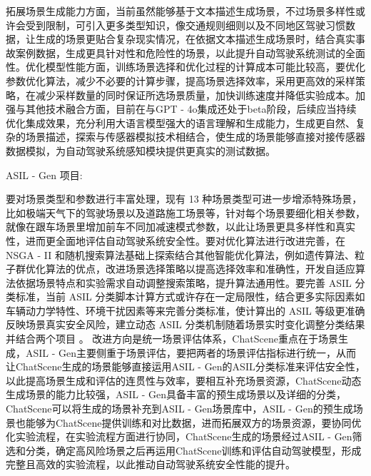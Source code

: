 拓展场景生成能力方面，当前虽然能够基于文本描述生成场景，不过场景多样性或许会受到限制，可引入更多类型知识，像交通规则细则以及不同地区驾驶习惯数据，让生成的场景更贴合复杂现实情况，在依据文本描述生成场景时，结合真实事故案例数据，生成更具针对性和危险性的场景，以此提升自动驾驶系统测试的全面性。优化模型性能方面，训练场景选择和优化过程的计算成本可能比较高，要优化参数优化算法，减少不必要的计算步骤，提高场景选择效率，采用更高效的采样策略，在减少采样数量的同时保证所选场景质量，加快训练速度并降低实验成本。加强与其他技术融合方面，目前在与GPT - 4o集成还处于beta阶段\cite{uslu2014underground}，后续应当持续优化集成效果，充分利用大语言模型强大的语言理解和生成能力，生成更自然、复杂的场景描述，探索与传感器模拟技术相结合，使生成的场景能够直接对接传感器数据模拟，为自动驾驶系统感知模块提供更真实的测试数据。


ASIL - Gen 项目:


要对场景类型和参数进行丰富处理，现有 13 种场景类型可进一步增添特殊场景，比如极端天气下的驾驶场景以及道路施工场景等，针对每个场景要细化相关参数，就像在跟车场景里增加前车不同加减速模式参数，以此让场景更具多样性和真实性，进而更全面地评估自动驾驶系统安全性。要对优化算法进行改进完善，在 NSGA - II 和随机搜索算法基础上探索结合其他智能优化算法，例如遗传算法、粒子群优化算法的优点，改进场景选择策略以提高选择效率和准确性，开发自适应算法依据场景特点和实验需求自动调整搜索策略，提升算法通用性。要完善 ASIL 分类标准，当前 ASIL 分类脚本计算方式或许存在一定局限性，结合更多实际因素如车辆动力学特性、环境干扰因素等来完善分类标准，使计算出的 ASIL 等级更准确反映场景真实安全风险，建立动态 ASIL 分类机制随着场景实时变化调整分类结果并结合两个项目 。
改进方向是统一场景评估体系，ChatScene重点在于场景生成，ASIL - Gen主要侧重于场景评估，要把两者的场景评估指标进行统一，从而让ChatScene生成的场景能够直接运用ASIL - Gen的ASIL分类标准来评估安全性，以此提高场景生成和评估的连贯性与效率，要相互补充场景资源，ChatScene动态生成场景的能力比较强，ASIL - Gen具备丰富的预生成场景以及详细的分类\cite{sayer2009integrated}，ChatScene可以将生成的场景补充到ASIL - Gen场景库中，ASIL - Gen的预生成场景也能够为ChatScene提供训练和对比数据，进而拓展双方的场景资源，要协同优化实验流程，在实验流程方面进行协同，ChatScene生成的场景经过ASIL - Gen筛选和分类，确定高风险场景之后再运用ChatScene训练和评估自动驾驶模型，形成完整且高效的实验流程，以此推动自动驾驶系统安全性能的提升。

\newpage
